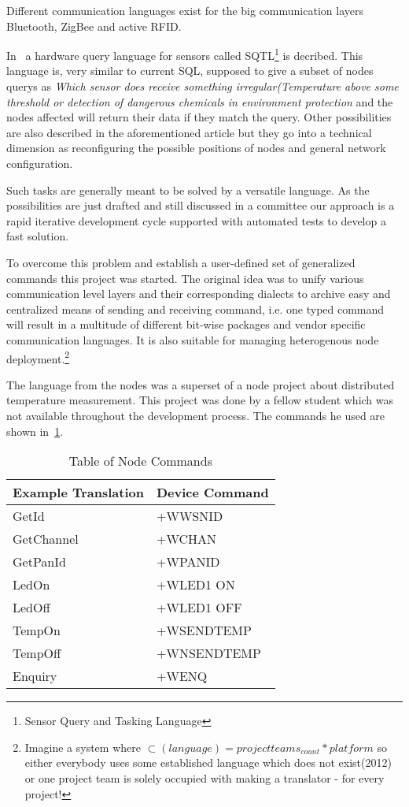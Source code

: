 Different communication languages exist for the big communication layers Bluetooth, ZigBee and active RFID.

In~\cite[p. 407]{Akyildiz02wirelesssensor} a hardware query language for sensors called \textsc{SQTL}\footnote{Sensor Query and Tasking Language}
is decribed. This language is, very similar to current \textsc{SQL}, supposed to give a subset of nodes querys as \textit{Which sensor does receive
something irregular(Temperature above some threshold or detection of dangerous chemicals in environment protection} and the nodes affected 
will return their data if they match the query. Other possibilities are also described in the aforementioned article but they go into a technical
dimension as reconfiguring the possible positions of nodes and general network configuration.

Such tasks are generally meant to be solved by a versatile language. As the possibilities are just drafted and still discussed in a committee our 
approach is a rapid iterative development cycle supported with automated tests to develop a fast solution.

To overcome this problem and establish a user-defined set of generalized commands this project was started.
The original idea was to unify various communication level layers and their corresponding dialects to 
archive easy and centralized means of sending and receiving command, i.e. one typed command will result in 
a multitude of different bit-wise packages and vendor specific communication languages.
It is also suitable for managing heterogenous node deployment.\footnote{Imagine a system where \(\subset(language)=project teams_{count} * platform \) 
so either everybody uses some established language which does not exist(2012) or one project team is solely occupied with 
making a translator - for every project!}

The language from the nodes was a superset of a node project about distributed temperature measurement. This project was done by 
a fellow student which was not available throughout the development process. The commands he used are shown in~\ref{tab:nodecommands}.

\begin{table}[!h] 
\centering 
\begin{tabular}{|l||l|} 
Example Translation & Device Command \\ 
\hline
GetId & +WWSNID \\
GetChannel & +WCHAN \\
GetPanId & +WPANID \\
LedOn & +WLED1 ON \\
LedOff & +WLED1 OFF \\
TempOn & +WSENDTEMP \\
TempOff & +WNSENDTEMP \\
Enquiry & +WENQ \\
\end{tabular} 
\caption{ Table of Node Commands} 
\label{tab:nodecommands} 
\end{table}

